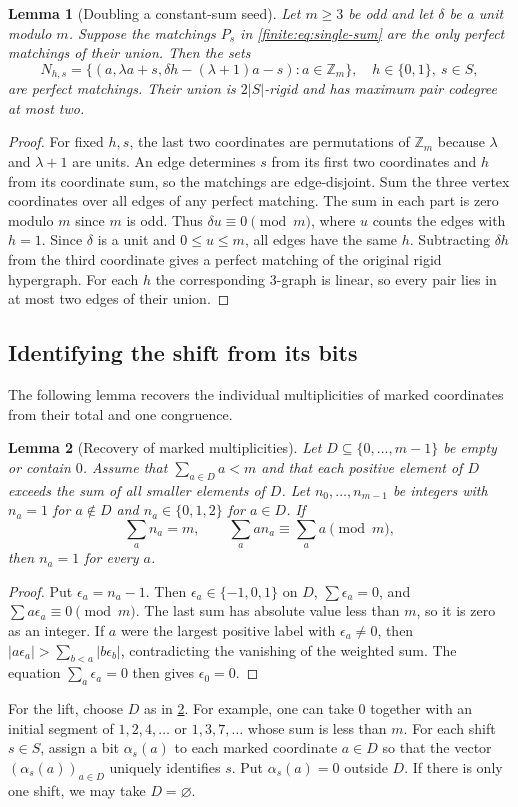 \documentclass[10pt]{article}
\numberwithin{equation}{section}
\newtheorem{lemma}[lemma]{Lemma}\aliascntresetthe{lemma}
\begin{document}
\begin{lemma}[Doubling a constant-sum seed]\label{finite:lem:double-sum}
Let $m\ge3$ be odd and let $\delta$ be a unit modulo $m$. Suppose the
matchings $P_s$ in \cref{finite:eq:single-sum} are the only perfect
matchings of their union. Then the sets
\[
 N_{h,s}=\{(a,\lambda a+s,\delta h-(\lambda+1)a-s):a\in\mathbb Z_m\},
 \quad h\in\{0,1\},\ s\in S,
\]
are perfect matchings. Their union is $2|S|$-rigid and has maximum
pair codegree at most two.
\end{lemma}
\begin{proof}
For fixed $h,s$, the last two coordinates are permutations of $\mathbb Z_m$ because $\lambda$ and $\lambda+1$ are units. An edge determines $s$ from its first two coordinates and $h$ from its coordinate sum, so the matchings are edge-disjoint. Sum the three vertex coordinates over all edges of any perfect matching. The sum in each part is zero modulo $m$ since $m$ is odd. Thus $\delta u\equiv0\pmod m$, where $u$ counts the edges with $h=1$. Since $\delta$ is a unit and $0\le u\le m$, all edges have the same $h$. Subtracting $\delta h$ from the third coordinate gives a perfect matching of the original rigid hypergraph. For each $h$ the corresponding $3$-graph is linear, so every pair lies in at most two edges of their union.
\end{proof}

\subsection{Identifying the shift from its bits}
The following lemma recovers the individual multiplicities of marked coordinates from their total and one congruence.

\begin{lemma}[Recovery of marked multiplicities]\label{finite:lem:marked-counts}
Let $D\subseteq\{0,\ldots,m-1\}$ be empty or contain $0$. Assume that
$\sum_{a\in D}a<m$ and that each positive element of $D$ exceeds the
sum of all smaller elements of $D$. Let $n_0,\ldots,n_{m-1}$ be integers with $n_a=1$ for $a\notin D$
and $n_a\in\{0,1,2\}$ for $a\in D$. If
\[
 \sum_a n_a=m,\qquad \sum_a a n_a\equiv\sum_a a\pmod m,
\]
then $n_a=1$ for every $a$.
\end{lemma}
\begin{proof}
Put $\epsilon_a=n_a-1$. Then $\epsilon_a\in\{-1,0,1\}$ on $D$,
$\sum\epsilon_a=0$, and $\sum a\epsilon_a\equiv0\pmod m$.
The last sum has absolute value less than $m$, so it is zero as an
integer. If $a$ were the largest positive label with $\epsilon_a\ne0$, then
$|a\epsilon_a|>\sum_{b<a}|b\epsilon_b|$, contradicting the vanishing
of the weighted sum. The equation $\sum_a\epsilon_a=0$ then gives
$\epsilon_0=0$.
\end{proof}
For the lift, choose $D$ as in \cref{finite:lem:marked-counts}. For
example, one can take $0$ together with an initial segment of
$1,2,4,\ldots$ or $1,3,7,\ldots$ whose sum is less than $m$.
For each shift $s\in S$, assign a bit $\alpha_s(a)$ to each marked coordinate $a\in D$ so that the vector $(\alpha_s(a))_{a\in D}$ uniquely identifies $s$. Put $\alpha_s(a)=0$ outside $D$. If there is only one shift, we may take $D=\varnothing$.
\end{document}
